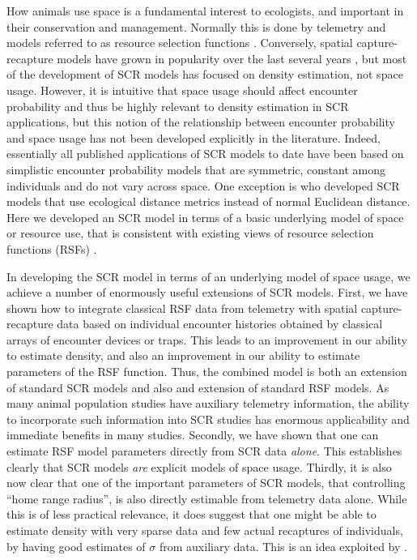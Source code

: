 How animals use space is a fundamental interest to ecologists, and
important in their conservation and management. Normally this is done
by telemetry and models referred to as resource selection functions
\citep{manly_etal:2002}.  Conversely, spatial capture-recapture models
have grown in popularity over the last several years
\citep{efford:2004,borchers_efford:2008, royle:2008, efford_etal:2009ecol,royle_etal:2009ecol,
  gardner_etal:2010, gardner_etal:2011, kery_etal:2010,
sollmann_etal:2011,mollet_etal:2012,gopalaswmany_etal:2012}, but
most of the development of SCR models has focused on density
estimation, not space usage.
However, it is intuitive that 
space usage should affect encounter probability and thus be highly
relevant to density estimation in SCR applications, but
this
notion of the relationship between encounter probability and space
usage has not been developed explicitly in the literature.  Indeed,
essentially all published applications of SCR models to date have been
based on simplistic encounter probability models that are symmetric,
constant among individuals and do not vary across space. One exception
is \citet{royle_etal:2012ecol} who developed SCR models that use
ecological distance metrics instead of normal Euclidean distance. Here
we developed an SCR model in terms of a basic underlying model of
space or resource use, that is consistent with existing views of
resource selection functions (RSFs) \citep{manly_etal:2002}.

In developing the SCR model in terms of an underlying model of space
usage, we achieve a number of enormously useful extensions of SCR
models. First, we have
 shown how to integrate classical RSF data from telemetry
with spatial capture-recapture data based on individual encounter
histories obtained by classical arrays of encounter devices or
traps. This leads to an improvement in our ability to estimate
density, and also an improvement in our ability to estimate parameters
of the RSF function.  Thus, the combined model is both an extension of
standard SCR models and also and extension of standard RSF models. As
many animal population studies have auxiliary telemetry information,
the ability to incorporate such information into SCR studies has
enormous applicability and immediate benefits in many studies.
Secondly, we have shown that one can estimate RSF model parameters
directly from SCR data {\it alone}. This establishes clearly that SCR
models {\it are} explicit models of space usage. Thirdly, it is also
now clear that one of the important parameters of SCR models, that
controlling ``home range radius'', is also directly estimable from
telemetry data alone. While this is of less practical relevance, it
does suggest that one might be able to estimate density with very
sparse data and few actual
recaptures of individuals, by having good estimates of $\sigma$ from
auxiliary data. This is an idea exploited by \citet{chandler_royle:2012}.


